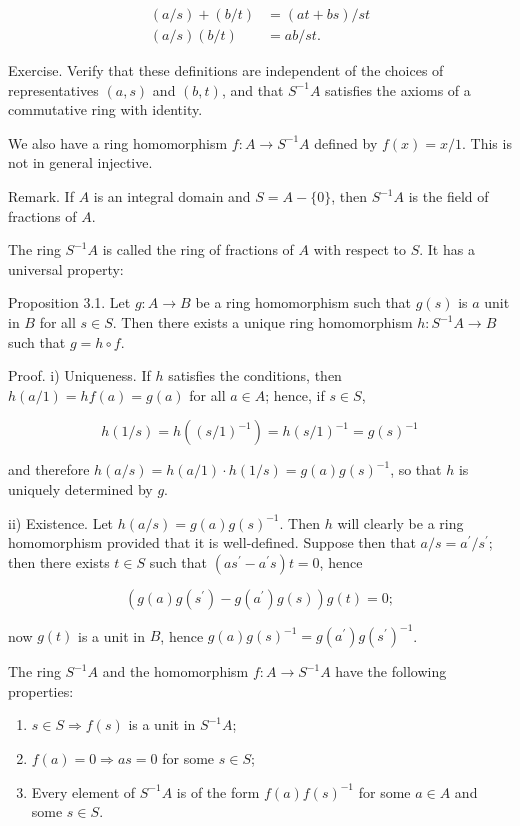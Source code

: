 \documentclass{standalone}
\theoremstyle{definition}
\theoremstyle{remark}
\begin{document}
\[
\begin{aligned}
(a / s)+(b / t) & =(a t+b s) / s t \\
(a / s)(b / t) & =a b / s t .
\end{aligned}
\]

Exercise. Verify that these definitions are independent of the choices of representatives $(a, s)$ and $(b, t)$, and that $S^{-1} A$ satisfies the axioms of a commutative ring with identity.

We also have a ring homomorphism $f: A \rightarrow S^{-1} A$ defined by $f(x)=x / 1$. This is not in general injective.

Remark. If $A$ is an integral domain and $S=A-\{0\}$, then $S^{-1} A$ is the field of fractions of $A$.

The ring $S^{-1} A$ is called the ring of fractions of $A$ with respect to $S$. It has a universal property:

Proposition 3.1. Let $g: A \rightarrow B$ be a ring homomorphism such that $g(s)$ is $a$ unit in $B$ for all $s \in S$. Then there exists a unique ring homomorphism $h: S^{-1} A \rightarrow B$ such that $g=h \circ f$.

Proof. i) Uniqueness. If $h$ satisfies the conditions, then $h(a / 1)=h f(a)=g(a)$ for all $a \in A$; hence, if $s \in S$,

\[
h(1 / s)=h\left((s / 1)^{-1}\right)=h(s / 1)^{-1}=g(s)^{-1}
\]

and therefore $h(a / s)=h(a / 1) \cdot h(1 / s)=g(a) g(s)^{-1}$, so that $h$ is uniquely determined by $g$.

ii) Existence. Let $h(a / s)=g(a) g(s)^{-1}$. Then $h$ will clearly be a ring homomorphism provided that it is well-defined. Suppose then that $a / s=a^{\prime} / s^{\prime}$; then there exists $t \in S$ such that $\left(a s^{\prime}-a^{\prime} s\right) t=0$, hence

\[
\left(g(a) g\left(s^{\prime}\right)-g\left(a^{\prime}\right) g(s)\right) g(t)=0 ;
\]

now $g(t)$ is a unit in $B$, hence $g(a) g(s)^{-1}=g\left(a^{\prime}\right) g\left(s^{\prime}\right)^{-1}$.

The ring $S^{-1} A$ and the homomorphism $f: A \rightarrow S^{-1} A$ have the following properties:

\begin{enumerate}
  \item $s \in S \Rightarrow f(s)$ is a unit in $S^{-1} A$;

  \item $f(a)=0 \Rightarrow a s=0$ for some $s \in S$;

  \item Every element of $S^{-1} A$ is of the form $f(a) f(s)^{-1}$ for some $a \in A$ and some $s \in S$.

\end{enumerate}
\end{document}
